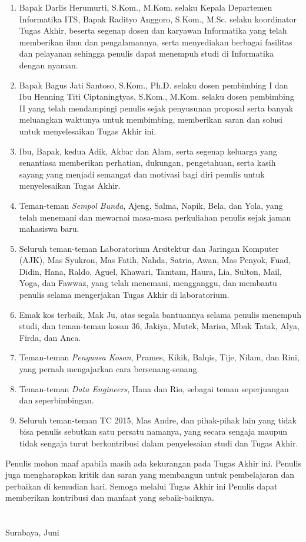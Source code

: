 \begin{enumerate}
	\item Bapak Darlis Herumurti, S.Kom., M.Kom. selaku Kepala Departemen Informatika ITS, Bapak Radityo Anggoro, S.Kom., M.Sc. selaku koordinator Tugas Akhir, beserta segenap dosen dan karyawan Informatika yang telah memberikan ilmu dan pengalamannya, serta menyediakan berbagai fasilitas dan pelayanan sehingga penulis dapat menempuh studi di Informatika dengan nyaman.
	\item Bapak Bagus Jati Santoso, S.Kom., Ph.D. selaku dosen pembimbing I dan Ibu Henning Titi Ciptaningtyas, S.Kom., M.Kom. selaku dosen pembimbing II yang telah mendampingi penulis sejak penyusunan proposal serta banyak meluangkan waktunya untuk membimbing, memberikan saran dan solusi untuk menyelesaikan Tugas Akhir ini.
	\item Ibu, Bapak, kedua Adik, Akbar dan Alam, serta segenap keluarga yang senantiasa memberikan perhatian, dukungan, pengetahuan, serta kasih sayang yang menjadi semangat dan motivasi bagi diri penulis untuk menyelesaikan Tugas Akhir.
	\item Teman-teman \textit{Sempol Bunda}, Ajeng, Salma, Napik, Bela, dan Yola, yang telah menemani dan mewarnai masa-masa perkuliahan penulis sejak jaman mahasiswa baru.
	\item Seluruh teman-teman Laboratorium Arsitektur dan Jaringan Komputer (AJK), Mas Syukron, Mas Fatih, Nahda, Satria, Awan, Mas Penyok, Fuad, Didin, Hana, Raldo, Aguel, Khawari, Tamtam, Haura, Lia, Sulton, Mail, Yoga, dan Fawwaz, yang telah menemani, mengganggu, dan membantu penulis selama mengerjakan Tugas Akhir di laboratorium. 
	\item Emak kos terbaik, Mak Ju, atas segala bantuannya selama penulis menempuh studi, dan teman-teman kosan 36, Jakiya, Mutek, Marisa, Mbak Tatak, Alya, Firda, dan Anca.
	\item Teman-teman \textit{Penguasa Kosan}, Prames, Kikik, Balqis, Tije, Nilam, dan Rini, yang pernah mengajarkan cara bersenang-senang.
	\item Teman-teman \textit{Data Engineers}, Hana dan Rio, sebagai teman seperjuangan dan seperbimbingan.
	\item Seluruh teman-teman TC 2015, Mas Andre, dan pihak-pihak lain yang tidak bisa penulis sebutkan satu persatu namanya, yang secara sengaja maupun tidak sengaja turut berkontribusi dalam penyelesaian studi dan Tugas Akhir.
\end{enumerate}

\pagebreak
Penulis mohon maaf apabila masih ada kekurangan pada Tugas Akhir ini. Penulis juga mengharapkan kritik dan saran yang membangun untuk pembelajaran dan perbaikan di kemudian hari. Semoga melalui Tugas Akhir ini Penulis dapat memberikan kontribusi dan manfaat yang sebaik-baiknya. \\ \\ \\

\hfill Surabaya, Juni \tahun \\ \\ \\

\hfill \penulis \\
\cleardoublepage
